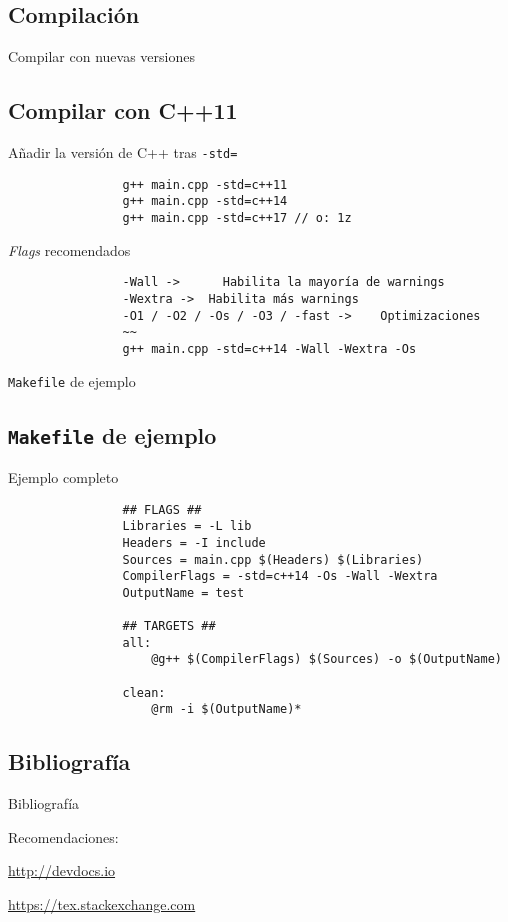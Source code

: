 \documentclass{beamer}
\newcommand{\normalSizeItem}[1] {
  \normalsize{\item #1}
}
\newcommand{\newFrameWithoutIndex}[1]{
	\begin{frame}
		#1
		\thispagestyle{empty}
	\end{frame}
}
\newcommand{\newSectionWithoutIndex}[1]{
	\newFrameWithoutIndex{\section{#1}}
}
\newcommand{\urlItem}[1]{
	\footnotesize{\item {\url {#1}}}
}
\begin{document}
	\newSectionWithoutIndex{Compilación}	
  
		\begin{frame}[fragile]{Compilar con nuevas versiones}	
			\subsection{Compilar con C++11}
			\begin{itemize}
			
				\normalSizeItem {Añadir la versión de C++ tras \texttt{-std=}}
				\begin{lstlisting}
				g++ main.cpp -std=c++11
				g++ main.cpp -std=c++14
				g++ main.cpp -std=c++17 // o: 1z
				\end{lstlisting}
				
				\normalSizeItem {\textit{Flags} recomendados}
				\begin{lstlisting}
				-Wall ->	  Habilita la mayoría de warnings
				-Wextra ->	Habilita más warnings
				-O1 / -O2 / -Os / -O3 / -fast ->	Optimizaciones
				~~
				g++ main.cpp -std=c++14 -Wall -Wextra -Os
				\end{lstlisting}
				
			\end{itemize}
		\end{frame}
		
		\begin{frame}[fragile]{\texttt{Makefile} de ejemplo}	
			\subsection{\texttt{Makefile} de ejemplo}
			\begin{itemize}
			
				\normalSizeItem {Ejemplo completo}
				\begin{lstlisting}
				## FLAGS ##
				Libraries = -L lib
				Headers = -I include
				Sources = main.cpp $(Headers) $(Libraries)
				CompilerFlags = -std=c++14 -Os -Wall -Wextra
				OutputName = test
				
				## TARGETS ##
				all: 
					@g++ $(CompilerFlags) $(Sources) -o $(OutputName)
				
				clean:
					@rm -i $(OutputName)*
				\end{lstlisting}
				
			\end{itemize}
		\end{frame}
		
	\newSectionWithoutIndex{Bibliografía}	
		\tiny
		\begin{frame}[allowframebreaks]{Bibliografía}
			
			
			\small
			Recomendaciones:
			\begin{itemize}
				\urlItem{http://devdocs.io}
				\urlItem{https://tex.stackexchange.com}
			\end{itemize}
		\end{frame}
\end{document}
